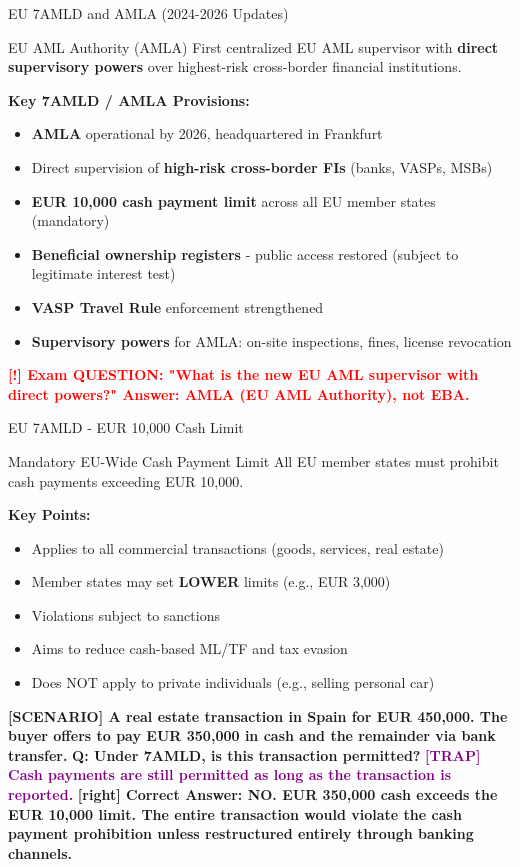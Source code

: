 \documentclass[11pt,a4paper]{beamer}
\newcommand{\redflag}[1]{\textcolor{red}{\textbf{[!] #1}}}
\newcommand{\trap}[1]{\textcolor{purple}{\textbf{[TRAP] #1}}}
\newcommand{\correct}[1]{\textcolor{green!50!black}{\textbf{[right] #1}}}
\newcommand{\scenario}[1]{\textcolor{blue!70!black}{\textbf{[SCENARIO] #1}}}
\begin{document}
\begin{frame}{EU 7AMLD and AMLA (2024-2026 Updates)}
\begin{block}{EU AML Authority (AMLA)}
First centralized EU AML supervisor with \textbf{direct supervisory powers} over highest-risk cross-border financial institutions.
\end{block}
\textbf{Key 7AMLD / AMLA Provisions:}
\begin{itemize}
\item \textbf{AMLA} operational by 2026, headquartered in Frankfurt
\item Direct supervision of \textbf{high-risk cross-border FIs} (banks, VASPs, MSBs)
\item \textbf{EUR 10,000 cash payment limit} across all EU member states (mandatory)
\item \textbf{Beneficial ownership registers} - public access restored (subject to legitimate interest test)
\item \textbf{VASP Travel Rule} enforcement strengthened
\item \textbf{Supervisory powers} for AMLA: on-site inspections, fines, license revocation
\end{itemize}
\redflag{Exam QUESTION: "What is the new EU AML supervisor with direct powers?" Answer: AMLA (EU AML Authority), not EBA.}
\end{frame}

\begin{frame}{EU 7AMLD - EUR 10,000 Cash Limit}
\begin{block}{Mandatory EU-Wide Cash Payment Limit}
All EU member states must prohibit cash payments exceeding EUR 10,000.
\end{block}
\textbf{Key Points:}
\begin{itemize}
\item Applies to all commercial transactions (goods, services, real estate)
\item Member states may set \textbf{LOWER} limits (e.g., EUR 3,000)
\item Violations subject to sanctions
\item Aims to reduce cash-based ML/TF and tax evasion
\item Does NOT apply to private individuals (e.g., selling personal car)
\end{itemize}
\scenario{A real estate transaction in Spain for EUR 450,000. The buyer offers to pay EUR 350,000 in cash and the remainder via bank transfer.}
\vspace{0.2cm}
\textbf{Q: Under 7AMLD, is this transaction permitted?}
\trap{Cash payments are still permitted as long as the transaction is reported.}
\correct{Correct Answer: NO. EUR 350,000 cash exceeds the EUR 10,000 limit. The entire transaction would violate the cash payment prohibition unless restructured entirely through banking channels.}
\end{frame}
\end{document}
